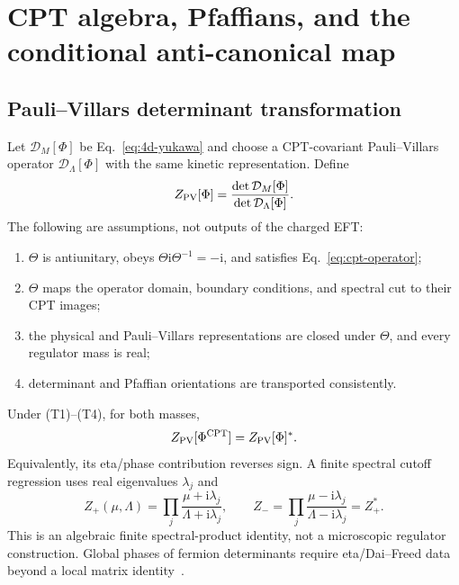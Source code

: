 \documentclass[11pt]{article}
\theoremstyle{definition}
\theoremstyle{remark}
\newcommand{\ii}{\mathrm i}
\begin{document}
\section{CPT algebra, Pfaffians, and the conditional anti-canonical map}

\subsection{Pauli--Villars determinant transformation}

Let \(\mathcal D_M[\Phi]\) be Eq.~\eqref{eq:4d-yukawa} and choose a
CPT-covariant Pauli--Villars operator \(\mathcal D_\Lambda[\Phi]\) with the
same kinetic representation.  Define
\begin{equation}
 Z_{\rm PV}[\Phi]
 =\frac{\det\mathcal D_M[\Phi]}{\det\mathcal D_\Lambda[\Phi]}.
 \label{eq:pv-ratio}
\end{equation}
The following are assumptions, not outputs of the charged EFT:
\begin{enumerate}[label=(T\arabic*)]
\item \(\Theta\) is antiunitary, obeys
  \(\Theta\ii\Theta^{-1}=-\ii\), and satisfies
  Eq.~\eqref{eq:cpt-operator};
\item \(\Theta\) maps the operator domain, boundary conditions, and spectral
  cut to their CPT images;
\item the physical and Pauli--Villars representations are closed under
  \(\Theta\), and every regulator mass is real;
\item determinant and Pfaffian orientations are transported consistently.
\end{enumerate}
Under (T1)--(T4), for both masses,
\begin{equation}
 Z_{\rm PV}[\Phi^{\rm CPT}]=Z_{\rm PV}[\Phi]^*.
 \label{eq:det-cpt}
\end{equation}
Equivalently, its eta/phase contribution reverses sign.  A finite spectral
cutoff regression uses real eigenvalues \(\lambda_j\) and
\begin{equation}
 Z_+(\mu,\Lambda)=\prod_j
 \frac{\mu+\ii\lambda_j}{\Lambda+\ii\lambda_j},\qquad
 Z_-=\prod_j
 \frac{\mu-\ii\lambda_j}{\Lambda-\ii\lambda_j}=Z_+^*.
 \label{eq:spectral-regulator}
\end{equation}
This is an algebraic finite spectral-product identity, not a microscopic
regulator construction.  Global
phases of fermion determinants require eta/Dai--Freed data beyond a local
matrix identity~\cite{WittenYonekura2019APE6}.
\end{document}
